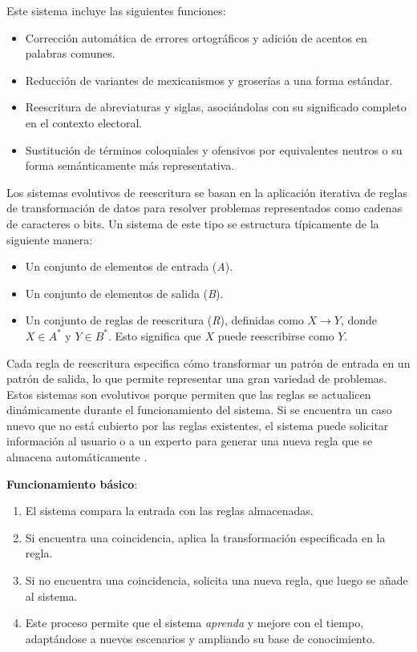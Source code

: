 \documentclass[10pt, a4paper]{article}
\begin{document}
	Este sistema incluye las siguientes funciones:
	\begin{itemize}
		\item Corrección automática de errores ortográficos y adición de acentos en palabras comunes.
		\item Reducción de variantes de mexicanismos y groserías a una forma estándar.
		\item Reescritura de abreviaturas y siglas, asociándolas con su significado completo en el contexto electoral.
		\item Sustitución de términos coloquiales y ofensivos por equivalentes neutros o su forma semánticamente más representativa.
	\end{itemize}
	
	Los sistemas evolutivos de reescritura se basan en la aplicación iterativa de reglas de transformación de datos para resolver problemas representados como cadenas de caracteres o bits. Un sistema de este tipo se estructura típicamente de la siguiente manera:
	
	\begin{itemize}
		\item Un conjunto de elementos de entrada (\textit{A}).
		\item Un conjunto de elementos de salida (\textit{B}).
		\item Un conjunto de reglas de reescritura (\textit{R}), definidas como $X \rightarrow Y$, donde $X \in A^*$ y $Y \in B^*$. Esto significa que $X$ puede reescribirse como $Y$.
	\end{itemize}
	
	Cada regla de reescritura especifica cómo transformar un patrón de entrada en un patrón de salida, lo que permite representar una gran variedad de problemas. Estos sistemas son evolutivos porque permiten que las reglas se actualicen dinámicamente durante el funcionamiento del sistema. Si se encuentra un caso nuevo que no está cubierto por las reglas existentes, el sistema puede solicitar información al usuario o a un experto para generar una nueva regla que se almacena automáticamente \parencite{galindo1991sistemas}.
	
	\textbf{Funcionamiento básico}:
	\begin{enumerate}
		\item El sistema compara la entrada con las reglas almacenadas.
		\item Si encuentra una coincidencia, aplica la transformación especificada en la regla.
		\item Si no encuentra una coincidencia, solicita una nueva regla, que luego se añade al sistema.
		\item Este proceso permite que el sistema \textit{aprenda} y mejore con el tiempo, adaptándose a nuevos escenarios y ampliando su base de conocimiento.
	\end{enumerate}
	
\end{document}

